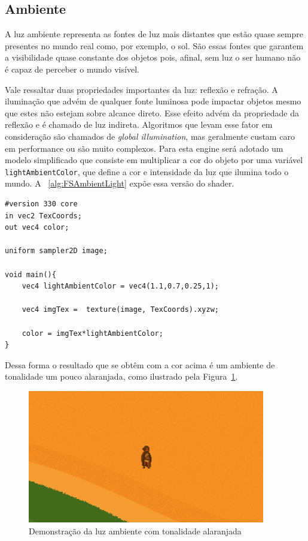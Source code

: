 \documentclass[12pt, 
openright, 
oneside, 
a4paper,    
brazil]{facom-ufu-abntex2}
\begin{document}
\subsection{Ambiente}
A luz ambiente representa as fontes de luz mais distantes que estão quase sempre presentes no mundo real como, por exemplo, o sol. São essas fontes que garantem a visibilidade quase constante dos objetos pois, afinal, sem luz o ser humano não é capaz de perceber o mundo visível.

Vale ressaltar duas propriedades importantes da luz: reflexão e refração. A iluminação que advém de qualquer fonte luminosa pode impactar objetos mesmo que estes não estejam sobre alcance direto. Esse efeito advém da propriedade da reflexão e é chamado de luz indireta. Algoritmos que levam esse fator em consideração são chamados de \textit{global illumination}, mas geralmente custam caro em performance ou são muito complexos.
Para esta engine será adotado um modelo simplificado que consiste em multiplicar a cor do objeto por uma variável \texttt{lightAmbientColor}, que define a cor e intensidade da luz que ilumina todo o mundo. A 
\lstlistingname~\ref{alg:FSAmbientLight} expõe essa versão do shader.
\begin{lstlisting}[caption=Fragment Shader com luz ambiente, label={alg:FSAmbientLight}]
#version 330 core
in vec2 TexCoords;
out vec4 color;

uniform sampler2D image;

void main(){
	vec4 lightAmbientColor = vec4(1.1,0.7,0.25,1);
	
	vec4 imgTex =  texture(image, TexCoords).xyzw;
	
	color = imgTex*lightAmbientColor;
}
\end{lstlisting}

Dessa forma o resultado que se obtêm com a cor acima é um ambiente de tonalidade um pouco alaranjada, como ilustrado pela Figura~\ref{fig:orangeAmbientLight}.

\begin{figure}[H]
	\centering
	\includegraphics[width=28em]{imagens/sunset.png}
	\caption{Demonstração da luz ambiente com tonalidade alaranjada}
	\label{fig:orangeAmbientLight}
\end{figure}
\end{document}

